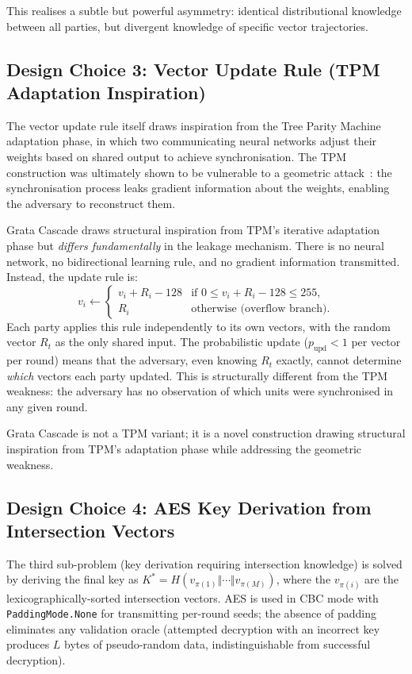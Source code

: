 \documentclass[11pt,a4paper]{article}
\begin{document}
This realises a subtle but powerful asymmetry: identical distributional knowledge between all parties, but divergent knowledge of specific vector trajectories.

\subsection{Design Choice 3: Vector Update Rule (TPM Adaptation Inspiration)}

The vector update rule itself draws inspiration from the Tree Parity Machine~\cite{KKK2002} adaptation phase, in which two communicating neural networks adjust their weights based on shared output to achieve synchronisation. The TPM construction was ultimately shown to be vulnerable to a geometric attack~\cite{KMS2003}: the synchronisation process leaks gradient information about the weights, enabling the adversary to reconstruct them.

Grata Cascade draws structural inspiration from TPM's iterative adaptation phase but \emph{differs fundamentally} in the leakage mechanism. There is no neural network, no bidirectional learning rule, and no gradient information transmitted. Instead, the update rule is:
\[
v_i \gets \begin{cases} v_i + R_i - 128 & \text{if } 0 \leq v_i + R_i - 128 \leq 255, \\ R_i & \text{otherwise (overflow branch)}. \end{cases}
\]
Each party applies this rule independently to its own vectors, with the random vector $R_t$ as the only shared input. The probabilistic update ($p_\text{upd} < 1$ per vector per round) means that the adversary, even knowing $R_t$ exactly, cannot determine \emph{which} vectors each party updated. This is structurally different from the TPM weakness: the adversary has no observation of which units were synchronised in any given round.

Grata Cascade is not a TPM variant; it is a novel construction drawing structural inspiration from TPM's adaptation phase while addressing the geometric weakness.

\subsection{Design Choice 4: AES Key Derivation from Intersection Vectors}

The third sub-problem (key derivation requiring intersection knowledge) is solved by deriving the final key as $K^* = H(v_{\pi(1)} \Vert \cdots \Vert v_{\pi(M)})$, where the $v_{\pi(i)}$ are the lexicographically-sorted intersection vectors. AES is used in CBC mode with \texttt{PaddingMode.None} for transmitting per-round seeds; the absence of padding eliminates any validation oracle (attempted decryption with an incorrect key produces $L$ bytes of pseudo-random data, indistinguishable from successful decryption).
\end{document}
